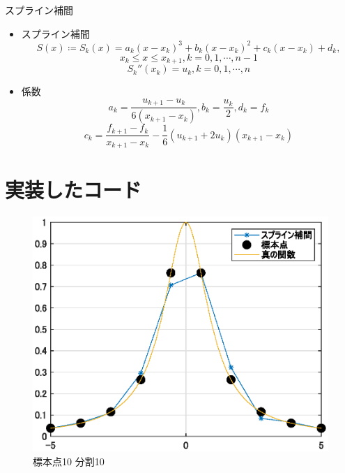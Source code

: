 \documentclass[titlepage, a4paper, 11pt, dvipdfmx]{jsarticle}
\begin{document}
\begin{itembox}[l]{スプライン補間}
    \begin{itemize}
        \item スプライン補間
      $$ S(x) \coloneqq S_k(x) = a_k(x-x_k)^3 + b_k(x-x_k)^2 + c_k(x-x_k) + d_k,$$
      $$ x_k \le x \le x_{k+1}, k=0, 1, \cdots ,n-1 $$
      $$ S_{k}''(x_k) = u_k, k=0, 1, \cdots ,n $$
        \item 係数
      $$ a_k = \frac{u_{k+1}-u_k}{6(x_{k+1}-x_k)}, b_k = \frac{u_k}{2}, d_k = f_k $$
      $$ c_k = \frac{f_{k+1}-f_k}{x_{k+1}-x_k}-\frac{1}{6}(u_{k+1}+2u_k)(x_{k+1}-x_k) $$
        
  \end{itemize}
\end{itembox}

\newpage


\section{実装したコード}



\begin{figure}[H]
  \begin{center}%
    \includegraphics[width=13.5cm]{./graphics/s-1010.eps}%
  \caption{標本点10 分割10}
  \label{Label}%
  \end{center}
\end{figure}
\end{document}
